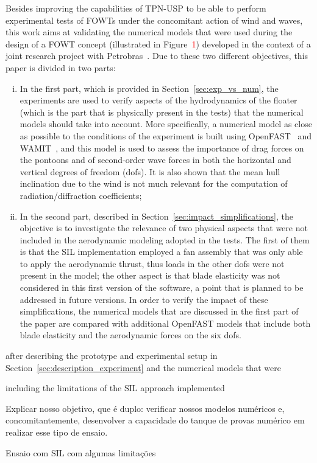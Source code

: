 Besides improving the capabilities of TPN-USP to be able to perform experimental tests of FOWTs under the concomitant action of wind and waves, this work aims at validating the numerical models that were used during the design of a FOWT concept (illustrated in Figure~\textcolor{red}{1}) developed in the context of a joint research project with Petrobras~\citep{mas2022parametric}. Due to these two different objectives, this paper is divided in two parts:
\begin{enumerate}[i.]
    \item In the first part, which is provided in Section~\ref{sec:exp_vs_num}, the experiments are used to verify aspects of the hydrodynamics of the floater (which is the part that is physically present in the tests) that the numerical models should take into account. More specifically, a numerical model as close as possible to the conditions of the experiment is built using OpenFAST~\cite{jonkman2005fast} and WAMIT~\cite{wamitManual}, and this model is used to assess the importance of drag forces on the pontoons and of second-order wave forces in both the horizontal and vertical degrees of freedom (dofs). It is also shown that the mean hull inclination due to the wind is not much relevant for the computation of radiation/diffraction coefficients;
    \item In the second part, described in Section~\ref{sec:impact_simplifications}, the objective is to investigate the relevance of two physical aspects that were not included in the aerodynamic modeling adopted in the tests. The first of them is that the SIL implementation employed a fan assembly that was only able to apply the aerodynamic thrust, thus loads in the other dofs were not present in the model; the other aspect is that blade elasticity was not considered in this first version of the software, a point that is planned to be addressed in future versions. In order to verify the impact of these simplifications, the numerical models that are discussed in the first part of the paper are compared with additional OpenFAST models that include both blade elasticity and the aerodynamic forces on the six dofs.
\end{enumerate}

after describing the prototype and experimental setup in Section~\ref{sec:description_experiment} and the numerical models that were 

including the limitations of the SIL approach implemented


Explicar nosso objetivo, que é duplo: verificar nossos modelos numéricos e, concomitantemente, desenvolver a capacidade do tanque de provas numérico em realizar esse tipo de ensaio.

Ensaio com SIL com algumas limitações
